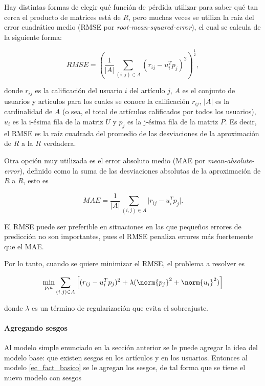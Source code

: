 Hay distintas formas de elegir qué función de pérdida utilizar para saber qué tan cerca el producto de matrices está de $R$, pero muchas veces se utiliza la raíz del error cuadrático medio (RMSE por \textit{root-mean-squared-error}), el cual se calcula de la siguiente forma:

\begin{equation}
  \label{ec:rmse}
  RMSE = \left ( \frac{1}{\vert A \vert} \sum_{(i,j) \in A} (r_{ij} - u_i^Tp_j )^2 \right ) ^ \frac{1}{2},
\end{equation}

donde $r_{ij}$ es la calificación del usuario $i$ del artículo $j$, $A$ es el conjunto de usuarios y artículos para los cuales se conoce la calificación $r_{ij}$, $ \vert A \vert$ es la cardinalidad de $A$ (o sea, el total de artículos calificados por todos los usuarios), $u_i$ es la i-ésima fila de la matriz $U$ y $p_j$ es la j-ésima fila de la matriz $P$. Es decir, el RMSE es la raíz cuadrada del promedio de las desviaciones de la aproximación de $R$ a la $R$ verdadera. 

Otra opción muy utilizada es el error absoluto medio (MAE por \textit{mean-absolute-error}), definido como la suma de las desviaciones absolutas de la aproximación de $R$ a $R$, esto es

\[
MAE = \frac{1}{\vert A \vert} \sum_{(i,j) \in A} \vert r_{ij} - u_i^Tp_j \vert.
\]

El RMSE puede ser preferible en situaciones en las que pequeños errores de predicción no son importantes, pues el RMSE penaliza errores más fuertemente que el MAE.

Por lo tanto, cuando se quiere minimizar el RMSE, el problema a resolver es

\begin{equation}
\min_{p, u} \sum_{(i,j) \in A} \left [ (r_{ij} - u_i^Tp_j )^2 + \lambda ( \norm{p_j}^2 + \norm{u_i}^2 ) \right ]
\end{equation}

donde $\lambda$ es un término de regularización que evita el sobreajuste.

\paragraph{Agregando sesgos}

Al modelo simple enunciado en la sección anterior se le puede agregar la idea del modelo base: que existen sesgos en los artículos y en los usuarios. Entonces al modelo \ref{ec_fact_basico} se le agregan los sesgos, de tal forma que se tiene el nuevo modelo con sesgos

